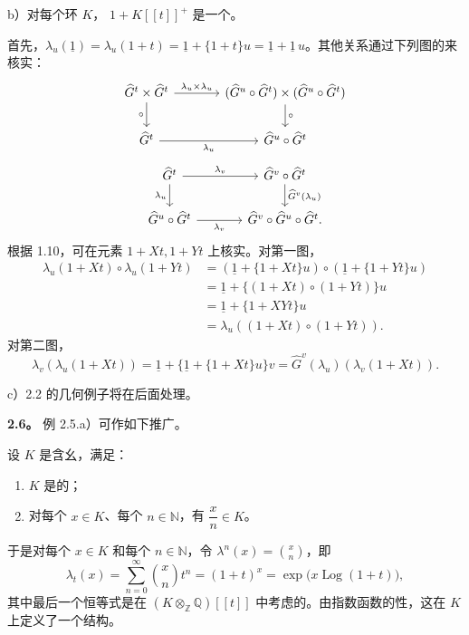 b）对每个环 $K$， $1+K[[t]]^+$ 是一个。

首先，$\lambda_u(\underline1)=\lambda_u(1+t)=\underline1+\{1+t\}u=\underline1+\underline1\,u$。其他关系通过下列图的来核实：
\[
\begin{tikzcd}[column sep=large]
\widehat G^t\times\widehat G^t
\arrow[r,"\lambda_u\times\lambda_u"]\arrow[d,"\circ"'] &
(\widehat G^u\circ\widehat G^t)\times(\widehat G^u\circ\widehat G^t)
\arrow[d,"\circ"]\\
\widehat G^t\arrow[r,"\lambda_u"'] & \widehat G^u\circ\widehat G^t
\end{tikzcd}
\]
\[
\begin{tikzcd}[column sep=large]
\widehat G^t\arrow[r,"\lambda_v"]\arrow[d,"\lambda_u"'] &
\widehat G^v\circ\widehat G^t\arrow[d,"\widehat G^v(\lambda_u)"]\\
\widehat G^u\circ\widehat G^t\arrow[r,"\lambda_v"'] &
\widehat G^v\circ\widehat G^u\circ\widehat G^t.
\end{tikzcd}
\]
根据 1.10，可在元素 $1+Xt,1+Yt$ 上核实。对第一图，
\[
\begin{aligned}
\lambda_u(1+Xt)\circ\lambda_u(1+Yt)
&=(\underline1+\{1+Xt\}u)\circ(\underline1+\{1+Yt\}u)\\
&=\underline1+\{(1+Xt)\circ(1+Yt)\}u\\
&=\underline1+\{1+XYt\}u\\
&=\lambda_u((1+Xt)\circ(1+Yt)).
\end{aligned}
\]
对第二图，
\[
\lambda_v(\lambda_u(1+Xt))
=\underline1+\{\underline1+\{1+Xt\}u\}v
=\widehat G^v(\lambda_u)(\lambda_v(1+Xt)).
\]

c）2.2 的几何例子将在后面处理。

\textbf{2.6。} 例 2.5.a）可作如下推广。

设 $K$ 是含幺，满足：
\begin{enumerate}
\item[i)] $K$ 是的；
\item[ii)] 对每个 $x\in K$、每个 $n\in\mathbb N$，有 $\dfrac xn\in K$。
\end{enumerate}
于是对每个 $x\in K$ 和每个 $n\in\mathbb N$，令 $\lambda^n(x)=\binom xn$，即
\[
\lambda_t(x)=\sum_{n=0}^{\infty}\binom xn t^n
=(1+t)^x=\exp\bigl(x\operatorname{Log}(1+t)\bigr),
\tag{2.6.1}
\]
其中最后一个恒等式是在 $(K\otimes_{\mathbb Z}\mathbb Q)[[t]]$ 中考虑的。由指数函数的性，这在 $K$ 上定义了一个结构。

